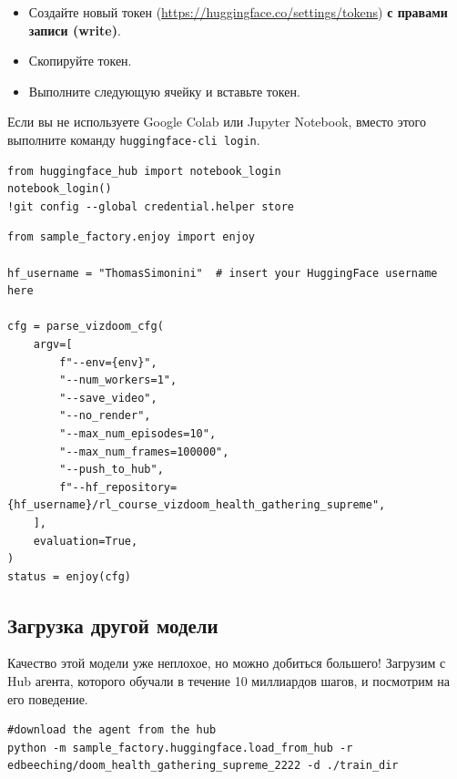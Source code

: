 \documentclass[11pt,a4paper]{article}
\begin{document}
\begin{itemize}
\tightlist
\item
  Создайте новый токен (\url{https://huggingface.co/settings/tokens}) \textbf{с правами записи (write)}.
\end{itemize}


\begin{itemize}
\tightlist
\item
  Скопируйте токен.
\item
  Выполните следующую ячейку и вставьте токен.
\end{itemize}

Если вы не используете Google Colab или Jupyter Notebook, вместо этого выполните команду \texttt{huggingface-cli\ login}.

\begin{lstlisting}
from huggingface_hub import notebook_login
notebook_login()
!git config --global credential.helper store
\end{lstlisting}

\begin{lstlisting}
from sample_factory.enjoy import enjoy

hf_username = "ThomasSimonini"  # insert your HuggingFace username here

cfg = parse_vizdoom_cfg(
    argv=[
        f"--env={env}",
        "--num_workers=1",
        "--save_video",
        "--no_render",
        "--max_num_episodes=10",
        "--max_num_frames=100000",
        "--push_to_hub",
        f"--hf_repository={hf_username}/rl_course_vizdoom_health_gathering_supreme",
    ],
    evaluation=True,
)
status = enjoy(cfg)
\end{lstlisting}

\subsection{Загрузка другой модели}\label{lets-load-another-model}

Качество этой модели уже неплохое, но можно добиться большего! Загрузим с Hub агента, которого обучали в течение 10 миллиардов шагов, и посмотрим на его поведение.

\begin{lstlisting}
#download the agent from the hub
python -m sample_factory.huggingface.load_from_hub -r edbeeching/doom_health_gathering_supreme_2222 -d ./train_dir
\end{lstlisting}
\end{document}
